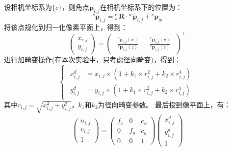 \documentclass[12pt, onecolumn]{article}
\begin{document}
	设相机坐标系为$\{c\}$，则角点${\boldsymbol{p}_{i,j}}$在相机坐标系下的位置为：
	\begin{equation}
	{^c\boldsymbol{p}_{i,j}}={^{c}_{w}\boldsymbol{R}}\cdot{^w\boldsymbol{p}_{i,j}}+{^c\boldsymbol{p}_{w}}
	\end{equation}
	将该点规化到归一化像素平面上，得到：
	\begin{equation}
	\begin{pmatrix}
	x_{i,j}\\y_{i,j}
	\end{pmatrix}=\begin{pmatrix}
	\begin{aligned}
	\frac{{^c\boldsymbol{p}_{i,j}}(x)}{{^c\boldsymbol{p}_{i,j}}(z)}
	\end{aligned}
	&
	\begin{aligned}		\frac{{^c\boldsymbol{p}_{i,j}}(y)}{{^c\boldsymbol{p}_{i,j}}(z)}
	\end{aligned}
	\end{pmatrix}^\top
	\end{equation}
	进行加畸变操作(在本次实验中，只考虑径向畸变)，得到：
	\begin{equation}
	\begin{cases}
	\begin{aligned}
	x_{i,j}^d&=x_{i,j}\times\left( 1+k_1\times r_{i,j}^2+k_2\times r_{i,j}^4\right) 
	\\
	y_{i,j}^d&=y_{i,j}\times\left( 1+k_1\times r_{i,j}^2+k_2\times r_{i,j}^4\right) 
	\end{aligned}
	\end{cases}
	\end{equation}
	其中$r_{i,j}=\sqrt{x_{i,j}^2+y_{i,j}^2}$，$k_1$和$k_2$为径向畸变参数。
	最后投到像平面上，有：
	\begin{equation}
	\begin{pmatrix}
	u_{i,j}\\v_{i,j}\\1
	\end{pmatrix}=
	\begin{pmatrix}
	f_x&0&c_x\\
	0&f_y&c_y\\
	0&0&1
	\end{pmatrix}
	\begin{pmatrix}
		x_{i,j}^d\\y_{i,j}^d\\1
	\end{pmatrix}
	\end{equation}
	
\end{document}
